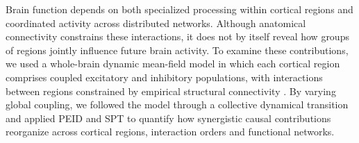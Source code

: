 \documentclass[fleqn,10pt]{wlscirep}
\theoremstyle{naturetheorem}
\begin{document}
Brain function depends on both specialized processing within cortical regions and coordinated activity across distributed networks. Although anatomical connectivity constrains these interactions, it does not by itself reveal how groups of regions jointly influence future brain activity. To examine these contributions, we used a whole-brain dynamic mean-field model in which each cortical region comprises coupled excitatory and inhibitory populations, with interactions between regions constrained by empirical structural connectivity \cite{Deco2014LocalEIRatio}. By varying global coupling, we followed the model through a collective dynamical transition and applied PEID and SPT to quantify how synergistic causal contributions reorganize across cortical regions, interaction orders and functional networks.

\end{document}
